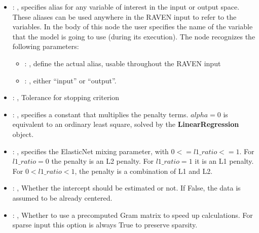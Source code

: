 \begin{itemize}
    \item {}: , 
      specifies alias for         any variable of interest in the input or output space. These
      aliases can be used anywhere in the RAVEN input to         refer to the variables. In the body
      of this node the user specifies the name of the variable that the model is going to use
      (during its execution).
      The  node recognizes the following parameters:
        \begin{itemize}
          \item {}: , 
            define the actual alias, usable throughout the RAVEN input
          \item {}: , 
            either ``input'' or ``output''.
      \end{itemize}

    \item {}: , 
      Tolerance for stopping criterion

    \item {}: , 
      specifies a constant                                                  that multiplies the
      penalty terms.                                                  $alpha = 0$ is equivalent to
      an ordinary least square, solved by the
      \textbf{LinearRegression} object.

    \item {}: , 
      specifies the                                                  ElasticNet mixing parameter,
      with $0 <= l1\_ratio <= 1$.                                                  For $l1\_ratio =
      0$ the penalty is an L2 penalty.                                                  For
      $l1\_ratio = 1$ it is an L1 penalty.                                                  For $0 <
      l1\_ratio < 1$, the penalty is a combination of L1 and L2.

    \item {}: , 
      Whether the intercept should be estimated or not. If False,
      the data is assumed to be already centered.

    \item {}: , 
      Whether to use a precomputed Gram matrix to speed up calculations.
      For sparse input this option is always True to preserve sparsity.


\end{itemize}
